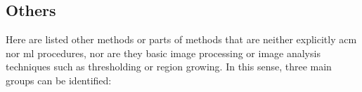 \documentclass[authoryear,preprint,review,12pt]{elsarticle}
\begin{document}
%

%

\subsection{Others}

Here are listed other methods or parts of methods that are neither explicitly \ac{acm} nor \ac{ml} procedures, nor are they basic image processing or image analysis techniques such as thresholding or region growing. In this sense, three main groups can be identified:
\end{document}

